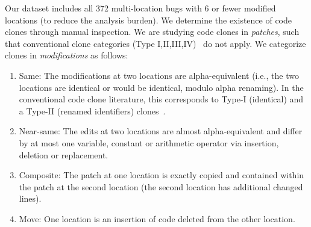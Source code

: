 \documentclass[10pt, conference]{IEEEtran}
\begin{document}
Our dataset includes all 372 multi-location bugs with 6 or fewer modified
locations (to reduce the analysis burden). We determine the existence of code 
clones through manual inspection.
%
%
%
We are studying code clones in \emph{patches}, such that conventional clone categories (Type I,II,III,IV)~\cite{convcodeclone} do not apply. We categorize clones in \emph{modifications} as follows:
\begin{enumerate}
\item Same: The modifications at two locations are alpha-equivalent (i.e., the two locations are identical or would be
identical, modulo alpha renaming). In the conventional code clone literature,
this corresponds to Type-I (identical) and a Type-II (renamed identifiers) clones~\cite{kclone}.
\item Near-same: The edits at two locations are almost alpha-equivalent and
  differ by at most one variable, constant or arithmetic operator via insertion, deletion or replacement.
\item Composite: The patch at one location is exactly copied and contained within the patch at 
the 
second location (the second location  has additional changed lines).
\item Move: One location is an insertion of 
code deleted from the other location. 
\end{enumerate}
\end{document}
